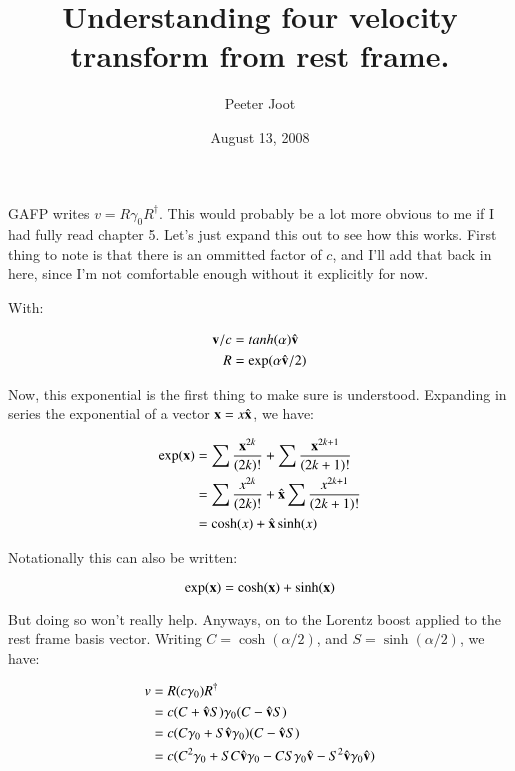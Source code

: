 \documentclass{article}      %
\title{Understanding four velocity transform from rest frame.}
\author{Peeter Joot}
\date{August 13, 2008}
\begin{document}

\maketitle{}

\section{}

GAFP writes $v = R \gamma_0 R^\dagger$.  This would probably be a lot more
obvious to me if I had fully read chapter 5.  Let's just expand this out
to see how this works.  First thing to note is that there is an ommitted factor
of $c$, and I'll add that back in here, since I'm not comfortable enough
without it explicitly for now.

With:

\begin{align*}
\mathbf{v}/c &= tanh(\alpha)\hat{\mathbf{v}} \\
R &= \exp(\alpha \hat{\mathbf{v}}/2)
\end{align*}

Now, this exponential is the first thing to make sure is understood.  Expanding
in series the exponential of a vector $\mathbf{x} = x\hat{\mathbf{x}}$, we have:

\begin{align*}
\exp(\mathbf{x})
&= \sum \frac{\mathbf{x}^{2k}}{(2k)!} + \sum \frac{\mathbf{x}^{2k+1}}{(2k+1)!} \\
&= \sum \frac{x^{2k}}{(2k)!} + \hat{\mathbf{x}} \sum \frac{x^{2k+1}}{(2k+1)!} \\
&= \cosh(x) + \hat{\mathbf{x}} \sinh(x)
\end{align*}

Notationally this can also be written:

\begin{equation*}
\exp(\mathbf{x}) = \cosh(\mathbf{x}) + \sinh(\mathbf{x})
\end{equation*}

But doing so won't really help.  Anyways, on to the Lorentz boost applied to the rest frame basis vector.  Writing
$C = \cosh(\alpha/2)$, and $S = \sinh(\alpha/2)$, we have:

\begin{align*}
v
&= R (c \gamma_0) R^\dagger \\
&= c (C + \hat{\mathbf{v}} S) \gamma_0 (C - \hat{\mathbf{v}} S) \\
&= c (C \gamma_0 + S \hat{\mathbf{v}} \gamma_0) (C - \hat{\mathbf{v}} S) \\
&= c ( C^2 \gamma_0 + SC \hat{\mathbf{v}} \gamma_0 -CS \gamma_0\hat{\mathbf{v}} - S^2 \hat{\mathbf{v}} \gamma_0 \hat{\mathbf{v}} ) \\
\end{align*}
\end{document}
